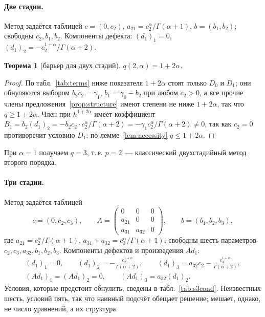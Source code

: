 \documentclass[11pt,a4paper]{article}
\theoremstyle{plain}
\newtheorem{theorem}{Теорема}
\theoremstyle{definition}
\newcommand{\G}{\Gamma}
\begin{document}
\paragraph{Две стадии.} Метод задаётся таблицей $c=(0,c_2)$, $a_{21}=c_2^{\alpha}/\G(\alpha+1)$, $b=(b_1,b_2)$; свободны $c_2,b_1,b_2$. Компоненты дефекта: $(d_1)_1=0$, $(d_1)_2=-c_2^{1+\alpha}/\G(\alpha+2)$.

\begin{theorem}[барьер для двух стадий]\label{thm:s2}
$q(2,\alpha)=1+2\alpha$.
\end{theorem}
\begin{proof}
По табл.~\ref{tab:terms} ниже показателя $1+2\alpha$ стоят только $D_0$ и $D_1$; они обнуляются выбором $b_2c_2=\gamma_1$, $b_1=\gamma_0-b_2$ при любом $c_2>0$, а все прочие члены предложения~\ref{prop:structure} имеют степени не ниже $1+2\alpha$, так что $q\ge1+2\alpha$. Член при $h^{1+2\alpha}$ имеет коэффициент $B_1=b_2(d_1)_2=-b_2c_2\cdot c_2^{\alpha}/\G(\alpha+2)=-\gamma_1c_2^{\alpha}/\G(\alpha+2)\neq0$, так как $c_2=0$ противоречит условию $D_1$; по лемме~\ref{lem:necessity} $q\le1+2\alpha$.
\end{proof}

При $\alpha=1$ получаем $q=3$, т.\,е. $p=2$~--- классический двухстадийный метод второго порядка.

\paragraph{Три стадии.} Метод задаётся таблицей
\[
c=(0,c_2,c_3),\qquad A=\begin{pmatrix}0&0&0\\a_{21}&0&0\\a_{31}&a_{32}&0\end{pmatrix},\qquad b=(b_1,b_2,b_3),
\]
где $a_{21}=c_2^{\alpha}/\G(\alpha+1)$, $a_{31}+a_{32}=c_3^{\alpha}/\G(\alpha+1)$; свободны шесть параметров $c_2,c_3,a_{32},b_1,b_2,b_3$. Компоненты дефектов и произведения $Ad_1$:
\begin{gather*}
(d_1)_1=0,\qquad (d_1)_2=-\frac{c_2^{1+\alpha}}{\G(\alpha+2)},\qquad (d_1)_3=a_{32}c_2-\frac{c_3^{1+\alpha}}{\G(\alpha+2)},\\
(Ad_1)_1=(Ad_1)_2=0,\qquad (Ad_1)_3=a_{32}(d_1)_2 .
\end{gather*}
Условия, которые предстоит обнулить, сведены в табл.~\ref{tab:s3cond}. Неизвестных шесть, условий пять, так что наивный подсчёт обещает решение; мешает, однако, не число уравнений, а их структура.
\end{document}
